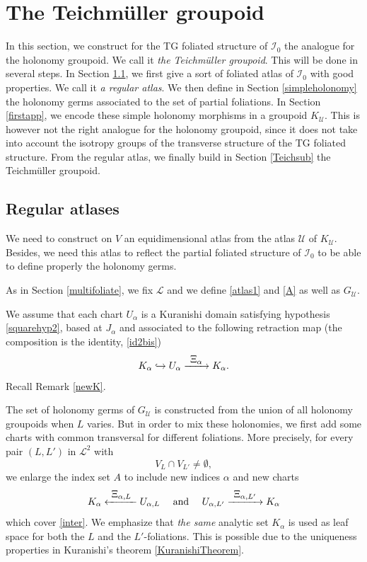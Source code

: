 \documentclass[JEP,XML,SOM,Unicode]{cedram}
\let\mathcal\mathscr
\def\hto{\mathrel{\lhook\joinrel\to}}
\def\To#1{\mathchoice{\xrightarrow{\textstyle\kern4pt#1\kern3pt}}{\stackrel{#1}{\longrightarrow}}{}{}}
\def\From#1{\mathchoice{\xleftarrow{\textstyle~#1~}}{\stackrel{#1}{\longleftarrow}}{}{}}
\theoremstyle{plain}
\theoremstyle{definition}
\theoremstyle{remark}
\numberwithin{equation}{section}
\newcommand{\cI}{\mathcal{I}}
\begin{document}
\section{The Teichmüller groupoid}
\label{Teichmueller}

In this section, we construct for the TG foliated structure of $\cI_0$ the analogue for the holonomy groupoid. We call it \emph{the Teichmüller groupoid}. This will be done in several steps. In Section \ref{regatlas}, we first give a sort of foliated atlas of $\cI_0$ with good properties. We call it \emph{a regular atlas}. We then define in Section \ref{simpleholonomy} the holonomy germs associated to the set of partial foliations. In Section \ref{firstapp}, we encode these simple holonomy morphisms in a groupoid $K_\mathcal U$. This is however not the right analogue for the holonomy groupoid, since it does not take into account the isotropy groups of the transverse structure of the TG foliated structure. From the regular atlas, we finally build in Section \ref{Teichsub} the Teichmüller groupoid.

\subsection{Regular atlases}
\label{regatlas}
We need to construct on $V$ an equidimensional atlas from the atlas $\mathcal U$ of $K_\mathcal U$.
Besides, we need this atlas to reflect the partial foliated structure of $\cI_0$ to be able to define properly the holonomy germs.

As in Section \ref{multifoliate}, we fix $\mathcal L$ and we define \eqref{atlas1} and \eqref{A} as well as $G_{\mathcal U}$.

We assume that each chart $U_{\alpha}$ is a Kuranishi domain satisfying hypothesis \ref{squarehyp2}, based at $J_\alpha$ and associated to the following retraction map (the composition is the identity, \cf \eqref{id2bis})\vspace*{-3pt}
\begin{equation}
\label{id2}
K_{\alpha}\hto U_{\alpha} \To{\Xi_{\alpha}}K_{\alpha}.
\end{equation}
Recall Remark \ref{newK}.

The set of holonomy germs of $G_{\mathcal U}$ is constructed from the union of all holonomy groupoids when $L$ varies. But in order to mix these holonomies, we first add some charts with common transversal for different foliations. More precisely, for every pair $(L,L')$ in $\mathcal L^2$ with
\begin{equation}
\label{inter}
V_L\cap V_{L'}\not =\emptyset,
\end{equation}
we enlarge the index set $A$ to include new indices $\alpha$ and new charts
\begin{equation}
\label{atlas2}
K_{\alpha} \From{\Xi_{\alpha, L}}U_{\alpha,L}\quad\text{ and }\quad U_{\alpha,L'} \To{\Xi_{\alpha, L'}} K_{\alpha}
\end{equation}
which cover \eqref{inter}. We emphasize that \emph{the same} analytic set $K_{\alpha}$ is used as leaf space for both the $L$ and the $L'$-foliations. This is possible due to the uniqueness properties in Kuranishi's theorem \ref{KuranishiTheorem}.
\end{document}
